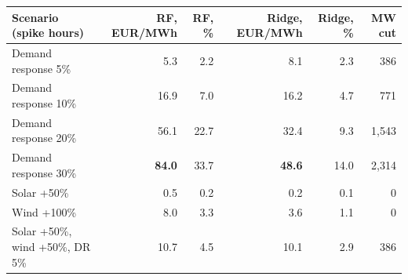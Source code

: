 \begin{tabular}{lrrrrr}
\toprule
Scenario (spike hours) & RF, EUR/MWh & RF, \% & Ridge, EUR/MWh & Ridge, \% & MW cut \\
\midrule
Demand response 5\% & 5.3 & 2.2 & 8.1 & 2.3 & 386 \\
Demand response 10\% & 16.9 & 7.0 & 16.2 & 4.7 & 771 \\
Demand response 20\% & 56.1 & 22.7 & 32.4 & 9.3 & 1,543 \\
Demand response 30\% & \textbf{84.0} & 33.7 & \textbf{48.6} & 14.0 & 2,314 \\
Solar +50\% & 0.5 & 0.2 & 0.2 & 0.1 & 0 \\
Wind +100\% & 8.0 & 3.3 & 3.6 & 1.1 & 0 \\
Solar +50\%, wind +50\%, DR 5\% & 10.7 & 4.5 & 10.1 & 2.9 & 386 \\
\bottomrule
\end{tabular}
